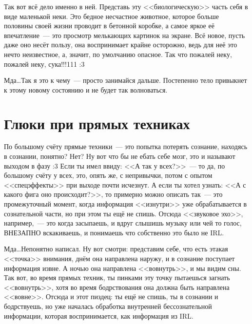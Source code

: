 \documentclass[a4paper,14pt,oneside]{memoir}
\begin{document}
Так вот всё дело именно в ней. Представь эту <<биологическую>> часть себя в виде маленькой неки. Это бедное несчастное животное, которое больше половины своей жизни проводит в бетонной коробке, а самое яркое её впечатление~--- это просмотр мелькающих картинок на экране. Всё новое, пусть даже оно несёт пользу, она воспринимает крайне осторожно, ведь для неё это нечто неизвестное, а, значит, по умолчанию опасное. Так что пожалей неку, пожалей неку, сука!!!111 :3
 
Мда\ldots Так я это к чему~--- просто занимайся дальше. Постепенно тело привыкнет к этому новому состоянию и не будет так волноваться. 




\section{Глюки при прямых техниках}


\medskip

По большому счёту прямые техники~--- это попытка потерять сознание, находясь в сознании, понятно? Нет? Ну вот что бы не ебать себе мозг, это и называют выходом в фазу :3 Если ты имел ввиду: <<А так у всех?>>~--- то да, по большому счёту у всех, это, опять же, с непривычки, потом с опытом <<спецэффекты>> при выходе почти исчезнут. А если ты хотел узнать: <<А с какого фига оно происходит?>>, то примерно можно описать так~--- это промежуточный момент, когда информация <<изнутри>> уже обрабатывается в сознательной части, но при этом ты ещё не спишь. Отсюда <<звуковое эхо>>, например,~--- это когда засыпаешь, и вдруг слышишь музыку или чей то голос, ВНЕЗАПНО вскакиваешь, и понимаешь что собственно это было не IRL.
 
Мда\ldots Непонятно написал. Ну вот смотри: представим себе, что есть этакая <<точка>> внимания, днём она направлена наружу, и в сознание поступает информация извне. А ночью она направлена <<вовнутрь>>, и мы видим сны. Так вот, во время прямых техник, ты пинками эту точку пытаешься загнать <<вовнутрь>>, хотя во время бодрствования она должна быть направлена <<вовне>>. Отсюда и этот пиздец: ты ещё не спишь, ты в сознании и бодрствуешь, но уже началась обработка внутренней бессознательной информации, которая воспринимается, как информация из IRL. 
\end{document}
